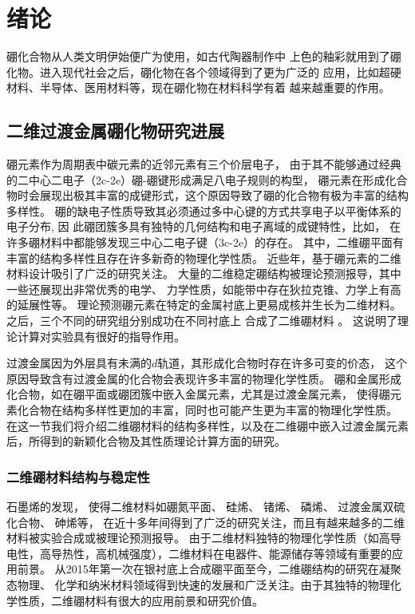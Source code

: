 \chapter{绪论}\label{chapter_introduction}
硼化合物从人类文明伊始便广为使用，如古代陶器制作中
上色的釉彩就用到了硼化物。进入现代社会之后，硼化物在各个领域得到了更为广泛的
应用，比如超硬材料、半导体、医用材料等，现在硼化物在材料科学有着
越来越重要的作用\cite{albert2009boron}。

\section{二维过渡金属硼化物研究进展}

硼元素作为周期表中碳元素的近邻元素有三个价层电子，
由于其不能够通过经典的二中心二电子（2c-2e）硼-硼键形成满足八电子规则的构型，
硼元素在形成化合物时会展现出极其丰富的成键形式，这个原因导致了硼的化合物有极为丰富的结构多样性。
硼的缺电子性质导致其必须通过多中心键的方式共享电子以平衡体系的电子分布, 因
此硼团簇多具有独特的几何结构和电子离域的成键特性\cite{Li2018BBB}，比如，
在许多硼材料中都能够发现三中心二电子键（3c-2e）的存在。
其中，二维硼平面有丰富的结构多样性且存在许多新奇的物理化学性质。
近些年，基于硼元素的二维材料设计吸引了广泛的研究关注。
大量的二维稳定硼结构被理论预测报导，其中一些还展现出非常优秀的电学、
力学性质，如能带中存在狄拉克锥、力学上有高的延展性等。
理论预测硼元素在特定的金属衬底上更易成核并生长为二维材料\cite{liu2013probing,liu2013boron,zhang2015two}。
之后，三个不同的研究组分别成功在不同衬底上
合成了二维硼材料\cite{mannix2015synthesis,zhong2017metastable,zhong2017synthesis,li2018experimental,feng2016experimental} 。
这说明了理论计算对实验具有很好的指导作用。

过渡金属因为外层具有未满的$d$轨道，其形成化合物时存在许多可变的价态，
这个原因导致含有过渡金属的化合物会表现许多丰富的物理化学性质。
硼和金属形成化合物，如在硼平面或硼团簇中嵌入金属元素，尤其是过渡金属元素，
使得硼元素化合物在结构多样性更加的丰富，同时也可能产生更为丰富的物理化学性质。
在这一节我们将介绍二维硼材料的结构多样性，以及在二维硼中嵌入过渡金属元素后，所得到的新颖化合物及其性质理论计算方面的研究。

\subsection{二维硼材料结构与稳定性}
石墨烯\cite{novoselov2005two, zhang2005experimental, ferrari2006raman,yan2012first, lu2009tuning}的发现，
使得二维材料如硼氮平面\cite{watanabe2004direct}、
硅烯\cite{liu2014comparison, molle2018silicene, li2018stable}、
锗烯\cite{liu2015multiple}、
磷烯\cite{hu2018strong}、
过渡金属双硫化合物\cite{cai2014constructing, wang2012electronics, pei2015exciton}、
砷烯\cite{zhang2015atomically}等，
在近十多年间得到了广泛的研究关注，而且有越来越多的二维材料被实验合成或被理论预测报导。
由于二维材料独特的物理化学性质（如高导电性，高导热性，高机械强度），二维材料在电器件、能源储存等领域有重要的应用前景。
从2015年第一次在银衬底上合成硼平面至今，二维硼结构的研究在凝聚态物理、
化学和纳米材料领域得到快速的发展和广泛关注。由于其独特的物理化学性质，二维硼材料有很大的应用前景和研究价值。


